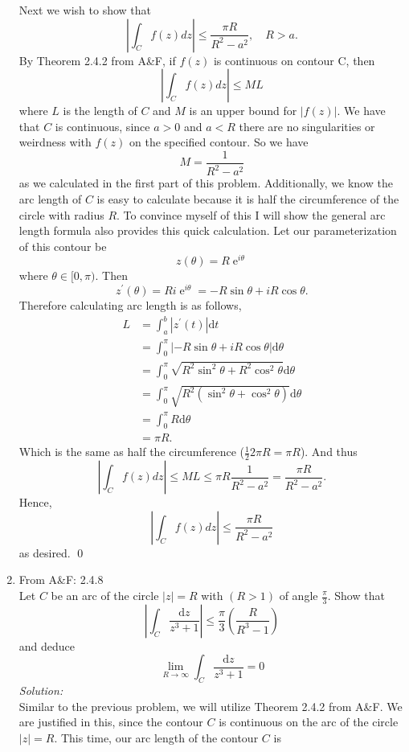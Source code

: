 \documentclass[10pt]{amsart}
\newcommand{\D}{\mathrm{d}}
\DeclareMathOperator{\E}{e}
\theoremstyle{nonumberplain}
\begin{document}
\begin{enumerate}[label={\bf {\arabic*}:}]
\noindent
Next we wish to show that 
$$
\left| \int_C f(z) dz \right| \leq \frac{\pi R}{R^2 - a^2}, \quad R > a.
$$
By Theorem 2.4.2 from A\&F, if $f(z)$ is continuous on contour C, then
$$
\left| \int_C f(z) dz \right| \leq ML
$$
where $L$ is the length of $C$ and $M$ is an upper bound for $\left| f(z) \right|$.
We have that $C$ is continuous, since $a >0$ and $a < R$ there are no singularities or weirdness with $f(z)$ on the specified contour.
So we have 
$$
M = \frac{1}{R^2 - a^2}
$$
as we calculated in the first part of this problem.
Additionally, we know the arc length of $C$ is easy to calculate because it is half the circumference of the circle with radius $R$.
To convince myself of this I will show the general arc length formula also provides this quick calculation.
Let our parameterization of this contour be $$z(\theta) = R\E^{i\theta}$$ where $\theta \in [0, \pi)$. Then $$z^\prime(\theta) = Ri\E^{i\theta} = -R\sin\theta + iR\cos\theta.$$
Therefore calculating arc length is as follows,
\begin{align*}
L &= \int_a^b |z^\prime(t)| \D t \\
	&= \int_{0}^{\pi} \left| -R\sin\theta + iR\cos\theta \right| \D \theta \\
	&= \int_{0}^{\pi} \sqrt{ R^2\sin^2\theta + R^2\cos^2\theta } \D \theta \\
	&= \int_{0}^{\pi} \sqrt{ R^2\left(\sin^2\theta + \cos^2\theta\right) } \D \theta \\
	&= \int_{0}^{\pi} R \D \theta \\
	&= \pi R.
\end{align*}
Which is the same as half the circumference ($\frac 1 2 2\pi R = \pi R$).
And thus
$$
\left| \int_C f(z) dz \right| \leq ML \leq \pi R\frac{1}{R^2 - a^2} = \frac{\pi R}{R^2 - a^2}.
$$
Hence, 
$$
\left| \int_C f(z) dz \right| \leq \frac{\pi R}{R^2 - a^2}
$$
as desired.
\qed
\\
\item From A\&F: 2.4.8 \\
Let $C$ be an arc of the circle $\left|z\right| = R$ with $(R > 1)$ of angle $\frac{\pi}{3}$.
Show that 
$$
\left| \int_C \frac{\D z}{z^3 + 1} \right| \leq \frac \pi 3 \left( \frac{R}{R^3 - 1} \right)
$$
and deduce
$$
\lim_{R \rightarrow \infty} \int_C \frac{\D z}{z^3 + 1} = 0
$$
\textit{Solution:} \\
Similar to the previous problem, we will utilize Theorem 2.4.2 from A\&F.
We are justified in this, since the contour $C$ is continuous on the arc of the circle $|z| = R$.
This time, our arc length of the contour $C$ is

\end{enumerate}
\end{document}
